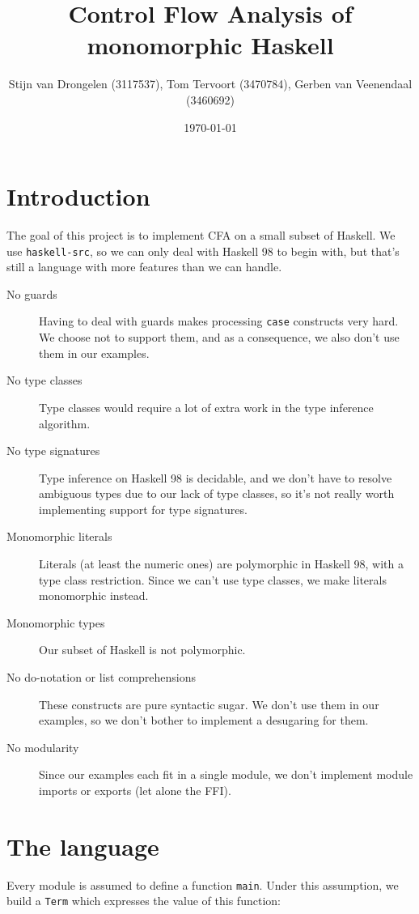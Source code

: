 \documentclass[a4paper]{scrartcl}
\title{Control Flow Analysis of monomorphic Haskell}
\author{Stijn van Drongelen {\tiny(3117537)},
        Tom Tervoort {\tiny(3470784)},
        Gerben van Veenendaal {\tiny(3460692)}}
\date{\today}
\begin{document}
\maketitle

\section{Introduction}
The goal of this project is to implement CFA on a small subset of Haskell.
We use \texttt{haskell-src}, so we can only deal with Haskell 98 to begin with,
but that's still a language with more features than we can handle.

\begin{description}
\item[No guards]
    Having to deal with guards makes processing \texttt{case} constructs very
    hard. We choose not to support them, and as a consequence, we also don't
    use them in our examples.
\item[No type classes]
    Type classes would require a lot of extra work in the type inference
    algorithm.
\item[No type signatures]
    Type inference on Haskell 98 is decidable, and we don't have to resolve
    ambiguous types due to our lack of type classes, so it's not really worth
    implementing support for type signatures.
\item[Monomorphic literals]
    Literals (at least the numeric ones) are polymorphic in Haskell 98, with
    a type class restriction. Since we can't use type classes, we make literals
    monomorphic instead.
\item[Monomorphic types]
    Our subset of Haskell is not polymorphic.
\item[No do-notation or list comprehensions]
    These constructs are pure syntactic sugar. We don't use them in our examples,
    so we don't bother to implement a desugaring for them.
\item[No modularity]
    Since our examples each fit in a single module, we don't implement module
    imports or exports (let alone the FFI).
\end{description}

\section{The language}
Every module is assumed to define a function \texttt{main}. Under this
assumption, we build a \texttt{Term} which expresses the value of this
function:
\end{document}
